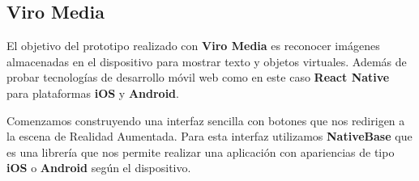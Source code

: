 \subsection{Viro Media} 
\label{makereference3.6.2}
\begin{flushleft}
El objetivo del prototipo realizado con \textbf{Viro Media} es reconocer imágenes almacenadas en el dispositivo para mostrar texto y
 objetos virtuales. Además de probar tecnologías de desarrollo móvil web como en este caso \textbf{React Native}
 para plataformas \textbf{iOS} y \textbf{Android}.
\end{flushleft}
\begin{flushleft}
Comenzamos construyendo una interfaz sencilla con botones que nos redirigen a la escena de Realidad Aumentada.
Para esta interfaz utilizamos \textbf{NativeBase} que es una librería que nos permite
realizar una aplicación con apariencias de tipo \textbf{iOS} o \textbf{Android} según el dispositivo.
\end{flushleft}

